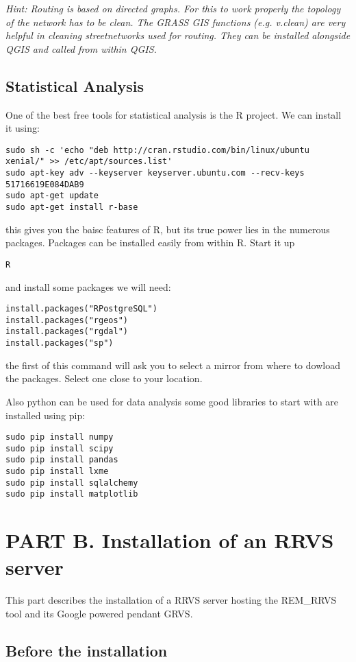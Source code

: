\documentclass{article}
\begin{document}
\textit{Hint: Routing is based on directed graphs. For this
to work properly the topology of the network has to be clean.
The GRASS GIS functions (e.g. v.clean) are very helpful in cleaning
streetnetworks used for routing. They can be installed alongside
QGIS and called from within QGIS.}

\subsection{Statistical Analysis}
One of the best free tools for statistical analysis 
is the R project.
We can install it using:
\begin{verbatim}
sudo sh -c 'echo "deb http://cran.rstudio.com/bin/linux/ubuntu xenial/" >> /etc/apt/sources.list'
sudo apt-key adv --keyserver keyserver.ubuntu.com --recv-keys 51716619E084DAB9
sudo apt-get update
sudo apt-get install r-base
\end{verbatim}
this gives you the baisc features of R, but its true power lies
in the numerous packages. Packages can be installed easily from
within R. Start it up 
\begin{verbatim}
R
\end{verbatim}
and install some packages we will need:
\begin{verbatim}
install.packages("RPostgreSQL")
install.packages("rgeos")
install.packages("rgdal")
install.packages("sp")
\end{verbatim}
the first of this command will ask you to select a mirror from
where to dowload the packages. Select one close to your location.

Also python can be used for data analysis some good libraries
to start with are installed using pip:

\begin{verbatim}
sudo pip install numpy
sudo pip install scipy
sudo pip install pandas
sudo pip install lxme
sudo pip install sqlalchemy
sudo pip install matplotlib
\end{verbatim}


\section{PART B. Installation of an RRVS server}

This part describes the installation of a RRVS server hosting
the REM\_RRVS tool and its Google powered pendant GRVS.

\subsection{Before the installation}
\end{document}

